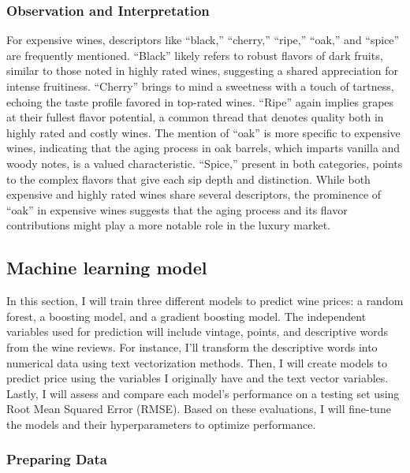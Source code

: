 \documentclass[
]{article}
\begin{document}
\hypertarget{observation-and-interpretation-1}{%
\subsubsection{Observation and
Interpretation}\label{observation-and-interpretation-1}}

For expensive wines, descriptors like ``black,'' ``cherry,'' ``ripe,''
``oak,'' and ``spice'' are frequently mentioned. ``Black'' likely refers
to robust flavors of dark fruits, similar to those noted in highly rated
wines, suggesting a shared appreciation for intense fruitiness.
``Cherry'' brings to mind a sweetness with a touch of tartness, echoing
the taste profile favored in top-rated wines. ``Ripe'' again implies
grapes at their fullest flavor potential, a common thread that denotes
quality both in highly rated and costly wines. The mention of ``oak'' is
more specific to expensive wines, indicating that the aging process in
oak barrels, which imparts vanilla and woody notes, is a valued
characteristic. ``Spice,'' present in both categories, points to the
complex flavors that give each sip depth and distinction. While both
expensive and highly rated wines share several descriptors, the
prominence of ``oak'' in expensive wines suggests that the aging process
and its flavor contributions might play a more notable role in the
luxury market.

\hypertarget{machine-learning-model}{%
\subsection{Machine learning model}\label{machine-learning-model}}

In this section, I will train three different models to predict wine
prices: a random forest, a boosting model, and a gradient boosting
model. The independent variables used for prediction will include
vintage, points, and descriptive words from the wine reviews. For
instance, I'll transform the descriptive words into numerical data using
text vectorization methods. Then, I will create models to predict price
using the variables I originally have and the text vector variables.
Lastly, I will assess and compare each model's performance on a testing
set using Root Mean Squared Error (RMSE). Based on these evaluations, I
will fine-tune the models and their hyperparameters to optimize
performance.

\hypertarget{preparing-data}{%
\subsubsection{Preparing Data}\label{preparing-data}}
\end{document}
